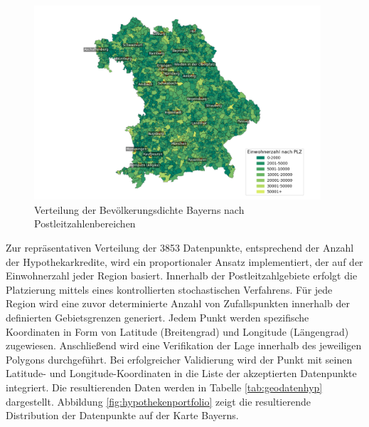 \begin{figure}[htbp]
    \centering
    \includegraphics[width=0.95\textwidth]{figures/Bayern_pop_plz.png}
    \caption{Verteilung der Bevölkerungsdichte Bayerns nach Postleitzahlenbereichen}
    \label{fig:bevoelkerungsdichte}
\end{figure}
\FloatBarrier

Zur repräsentativen Verteilung der 3853 Datenpunkte, entsprechend der Anzahl der Hypothekarkredite, wird ein proportionaler Ansatz implementiert, der auf der Einwohnerzahl jeder Region basiert. Innerhalb der Postleitzahlgebiete erfolgt die Platzierung mittels eines kontrollierten stochastischen Verfahrens. Für jede Region wird eine zuvor determinierte Anzahl von Zufallspunkten innerhalb der definierten Gebietsgrenzen generiert. Jedem Punkt werden spezifische Koordinaten in Form von Latitude (Breitengrad) und Longitude (Längengrad) zugewiesen. Anschließend wird eine Verifikation der Lage innerhalb des jeweiligen Polygons durchgeführt. Bei erfolgreicher Validierung wird der Punkt mit seinen Latitude- und Longitude-Koordinaten in die Liste der akzeptierten Datenpunkte integriert. Die resultierenden Daten werden in Tabelle \ref{tab:geodatenhyp} dargestellt. Abbildung \ref{fig:hypothekenportfolio} zeigt die resultierende Distribution der Datenpunkte auf der Karte Bayerns.

